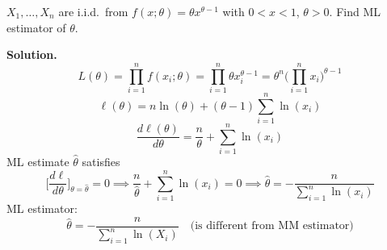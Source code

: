 \begin{Example}{}{}
    $ X_1,\ldots,X_n $ are i.i.d.\ from $ f(x;\theta)=\theta x^{\theta-1} $
    with $ 0<x<1 $, $ \theta>0 $.
    Find ML estimator of $ \theta $.

    \textbf{Solution.}
    \[ L(\theta)=\prod_{i=1}^n f(x_i;\theta)=
        \prod_{i=1}^n \theta x_i^{\theta-1}=\theta^n\biggl(\prod_{i=1}^n x_i \biggr)^{\theta-1} \]
    \[ \ell(\theta)=n\ln(\theta)+(\theta-1)\sum_{i=1}^{n} \ln(x_i) \]
    \[ \frac{d\ell(\theta)}{d\theta}=\frac{n}{\theta} +\sum_{i=1}^{n} \ln(x_i)  \]
    ML estimate $ \hat{\theta} $ satisfies
    \[ \biggl[\frac{d\ell}{d\theta}\biggr]_{\theta=\hat{\theta}}=0\implies
        \frac{n}{\hat{\theta}} +\sum_{i=1}^{n} \ln(x_i)=0
        \implies \hat{\theta}=-\frac{n}{\sum_{i=1}^{n} \ln(x_i)}  \]
    ML estimator:
    \[ \hat{\theta}=-\frac{n}{\sum_{i=1}^{n} \ln(X_i)}\quad\text{(is different from MM estimator)} \]
\end{Example}
